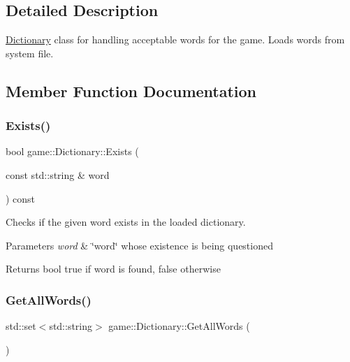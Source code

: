 \subsection{Detailed Description}
\hyperlink{classgame_1_1Dictionary}{Dictionary} class for handling acceptable words for the game. Loads words from system file. 

\subsection{Member Function Documentation}
\mbox{\label{classgame_1_1Dictionary_ab799d311640149a54645e2d1d2fd2c85}} 
\subsubsection{\texorpdfstring{Exists()}{Exists()}}
{\footnotesize\ttfamily bool game\+::\+Dictionary\+::\+Exists (\begin{DoxyParamCaption}\item[{const std\+::string \&}]{word }\end{DoxyParamCaption}) const}



Checks if the given word exists in the loaded dictionary. 


\begin{DoxyParams}{Parameters}
{\em word} & \char`\"{}word\char`\"{} whose existence is being questioned \\
\hline
\end{DoxyParams}
\begin{DoxyReturn}{Returns}
bool true if word is found, false otherwise 
\end{DoxyReturn}
\mbox{\label{classgame_1_1Dictionary_a7e0711a581d356b2106ef1a0ecbb00bf}} 
\subsubsection{\texorpdfstring{Get\+All\+Words()}{GetAllWords()}}
{\footnotesize\ttfamily std\+::set$<$std\+::string$>$ game\+::\+Dictionary\+::\+Get\+All\+Words (\begin{DoxyParamCaption}{ }\end{DoxyParamCaption})}



